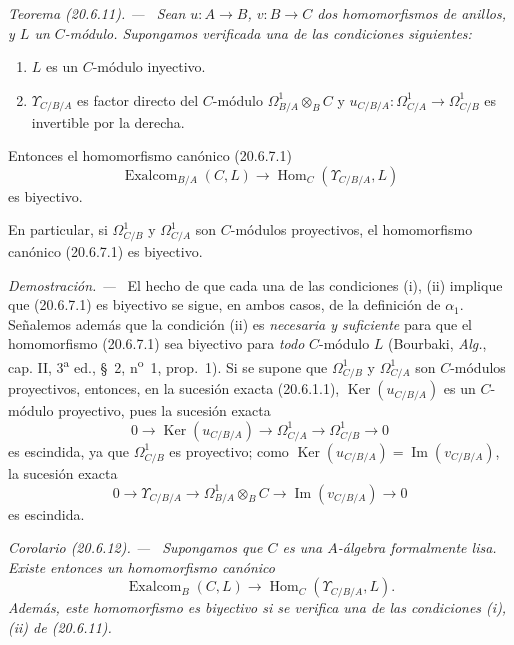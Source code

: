 \documentclass[10pt,oneside]{book}
\makeatletter
\newcommand{\setmanualcurrentlabel}[1]{\def\@currentlabel{#1}}
\newenvironment{theorem}[1][]{%
  \setmanualcurrentlabel{#1}\par\medskip\noindent\itshape Teorema (#1). ---\ }{\par}
\newenvironment{corollary}[1][]{%
  \setmanualcurrentlabel{#1}\par\medskip\noindent\itshape Corolario (#1). ---\ }{\par}
\newenvironment{proof}{%
  \par\medskip\noindent\textit{Demostración. ---\ }}{\par}
\makeatother
\begin{document}
\begin{theorem}[20.6.11]
\label{0.20.6.11-es}
Sean $u:A\to B$, $v:B\to C$ dos homomorfismos de anillos, y $L$ un
$C$-módulo. Supongamos verificada una de las condiciones siguientes:
\begin{enumerate}
  \item[\rm(i)] $L$ es un $C$-módulo inyectivo.
  \item[\rm(ii)] $\Upsilon_{C/B/A}$ es factor directo del $C$-módulo
$\Omega^1_{B/A}\otimes_B C$ y
$u_{C/B/A}:\Omega^1_{C/A}\to\Omega^1_{C/B}$ es invertible por la derecha.
\end{enumerate}
Entonces el homomorfismo canónico \textup{(20.6.7.1)}
\[
  \operatorname{Exalcom}_{B/A}(C,L)\longrightarrow
  \operatorname{Hom}_C(\Upsilon_{C/B/A},L)
\]
es biyectivo.

En particular, si $\Omega^1_{C/B}$ y $\Omega^1_{C/A}$ son
$C$-módulos proyectivos, el homomorfismo canónico \textup{(20.6.7.1)} es
biyectivo.
\end{theorem}

\begin{proof}
El hecho de que cada una de las condiciones (i), (ii) implique que (20.6.7.1) es
biyectivo se sigue, en ambos casos, de la definición de $\alpha_1$. Señalemos
además que la condición (ii) es \emph{necesaria y
suficiente} para que el homomorfismo (20.6.7.1) sea biyectivo para
\emph{todo} $C$-módulo $L$ (Bourbaki, \emph{Alg.}, cap. II,
3\textsuperscript{a} ed., \S~2, n\textsuperscript{o}~1, prop.~1). Si se
supone que $\Omega^1_{C/B}$ y $\Omega^1_{C/A}$ son $C$-módulos
proyectivos, entonces, en la sucesión exacta (20.6.1.1),
$\operatorname{Ker}(u_{C/B/A})$ es un $C$-módulo proyectivo, pues la sucesión exacta
\[
  0\longrightarrow\operatorname{Ker}(u_{C/B/A})\longrightarrow\Omega^1_{C/A}
  \longrightarrow\Omega^1_{C/B}\longrightarrow0
\]
es escindida, ya que $\Omega^1_{C/B}$ es proyectivo; como
$\operatorname{Ker}(u_{C/B/A})=\operatorname{Im}(v_{C/B/A})$, la sucesión exacta
\[
  0\longrightarrow\Upsilon_{C/B/A}\longrightarrow
  \Omega^1_{B/A}\otimes_B C\longrightarrow
  \operatorname{Im}(v_{C/B/A})\longrightarrow0
\]
es escindida.
\end{proof}

\begin{corollary}[20.6.12]
\label{0.20.6.12-es}
Supongamos que $C$ es una $A$-álgebra formalmente lisa. Existe entonces
un homomorfismo canónico
\begin{equation}
\tag{20.6.12.1}
\label{0.20.6.12.1-es}
  \operatorname{Exalcom}_B(C,L)\longrightarrow
  \operatorname{Hom}_C(\Upsilon_{C/B/A},L).
\end{equation}
Además, este homomorfismo es biyectivo si se verifica una de las condiciones \textup{(i)},
\textup{(ii)} de \textup{(20.6.11)}.
\end{corollary}
\end{document}
